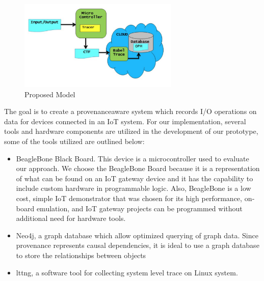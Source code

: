 \begin{figure}[h]
\begin{center}

\includegraphics[width =3.0in]{architecture.PNG}    
\end{center}
\caption{Proposed Model}
\label{architecture}
\end{figure}

The goal is to create a provenance\-aware system which records I/O operations on data for devices connected in an IoT system. For our implementation, several tools and hardware components are utilized in the development of our prototype, some of the tools utilized are outlined below:

\begin{itemize}
\item BeagleBone Black Board. This device is a microcontroller used to evaluate our approach. We choose the BeagleBone Board because it is a representation of what can be found on an IoT gateway device and it has the capability to include custom hardware in programmable logic. Also, BeagleBone is a low cost, simple IoT demonstrator that was chosen for its high performance, on­board emulation, and IoT gateway projects can be programmed without additional need for hardware tools.


\item Neo4j, a graph database which allow optimized querying of graph data. Since provenance represents causal dependencies, it is ideal to use a graph database to store the relationships between objects

\item lttng, a software tool for collecting system level trace on Linux system. 

\end{itemize}




